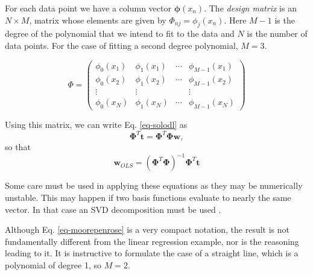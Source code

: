    For each data point we have a column vector $\boldsymbol{\phi}(x_n)$. The \emph{design matrix} is an $N \times M$, matrix whose
   elements are given by $\Phi_{nj} = \phi_j(x_n)$.
   Here $M-1$ is the degree of the polynomial that we intend to fit to the data and $N$ is the number of data points. For the case
   of fitting a second degree polynomial, $M=3$.
   
\begin{equation}
\Phi = \left( \begin{array}{cccc} \phi_0(x_1) & \phi_1(x_1) & \cdots & \phi_{M-1}(x_1) \\
                                  \phi_0(x_2) & \phi_1(x_2) & \cdots & \phi_{M-1}(x_2) \\ 
                                  \vdots      & \vdots      &        & \vdots          \\
                                  \phi_0(x_N) & \phi_1(x_N) & \cdots & \phi_{M-1}(x_N) \end{array}\right)
\end{equation}

Using this matrix, we can write Eq. \ref{eq-solodl} as
$$
  \boldsymbol{\Phi}^T \boldsymbol{t}  = \boldsymbol{\Phi}^T\boldsymbol{\Phi} \boldsymbol{w},
  $$
  so that
  \begin{equation}
    \boldsymbol{w}_{OLS} = (\boldsymbol{\Phi}^T\boldsymbol{\Phi})^{-1} \boldsymbol{\Phi}^T\boldsymbol{t}
      \label{eq-moorepenrose}
  \end{equation}
  
  Some care must be used in applying these equations as they may be numerically unstable. This may happen
  if two basis functions evaluate to nearly the same vector. In that case an SVD decomposition must be used
  \cite{bishop2006}.
  

  Although Eq. \ref{eq-moorepenrose} is a very compact notation, the result is not
  fundamentally different from the linear regression example, nor is the reasoning leading
  to it. It is instructive to formulate the case of a straight line, which is a polynomial
  of degree 1, so $M=2$.

